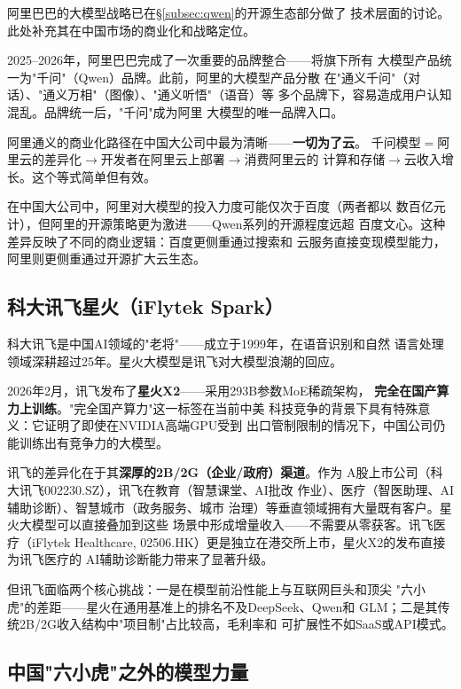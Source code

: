阿里巴巴的大模型战略已在§\ref{subsec:qwen}的开源生态部分做了
技术层面的讨论。此处补充其在中国市场的商业化和战略定位。

2025--2026年，阿里巴巴完成了一次重要的品牌整合——将旗下所有
大模型产品统一为"千问"（Qwen）品牌。此前，阿里的大模型产品分散
在"通义千问"（对话）、"通义万相"（图像）、"通义听悟"（语音）等
多个品牌下，容易造成用户认知混乱。品牌统一后，"千问"成为阿里
大模型的唯一品牌入口。

阿里通义的商业化路径在中国大公司中最为清晰——\textbf{一切为了云}。
千问模型$=$阿里云的差异化$\to$开发者在阿里云上部署$\to$消费阿里云的
计算和存储$\to$云收入增长。这个等式简单但有效。

在中国大公司中，阿里对大模型的投入力度可能仅次于百度（两者都以
数百亿元计），但阿里的开源策略更为激进——Qwen系列的开源程度远超
百度文心。这种差异反映了不同的商业逻辑：百度更侧重通过搜索和
云服务直接变现模型能力，阿里则更侧重通过开源扩大云生态。

\subsection{科大讯飞星火（iFlytek Spark）}
\label{subsec:spark}

科大讯飞是中国AI领域的"老将"——成立于1999年，在语音识别和自然
语言处理领域深耕超过25年。星火大模型是讯飞对大模型浪潮的回应。

2026年2月，讯飞发布了\textbf{星火X2}——采用293B参数MoE稀疏架构，
\textbf{完全在国产算力上训练}。"完全国产算力"这一标签在当前中美
科技竞争的背景下具有特殊意义：它证明了即使在NVIDIA高端GPU受到
出口管制限制的情况下，中国公司仍能训练出有竞争力的大模型。

讯飞的差异化在于其\textbf{深厚的2B/2G（企业/政府）渠道}。作为
A股上市公司（科大讯飞002230.SZ），讯飞在教育（智慧课堂、AI批改
作业）、医疗（智医助理、AI辅助诊断）、智慧城市（政务服务、城市
治理）等垂直领域拥有大量既有客户。星火大模型可以直接叠加到这些
场景中形成增量收入——不需要从零获客。讯飞医疗（iFlytek Healthcare,
02506.HK）更是独立在港交所上市，星火X2的发布直接为讯飞医疗的
AI辅助诊断能力带来了显著升级。

但讯飞面临两个核心挑战：一是在模型前沿性能上与互联网巨头和顶尖
"六小虎"的差距——星火在通用基准上的排名不及DeepSeek、Qwen和
GLM；二是其传统2B/2G收入结构中"项目制"占比较高，毛利率和
可扩展性不如SaaS或API模式。

\subsection{中国"六小虎"之外的模型力量}
\label{subsec:china-others}

